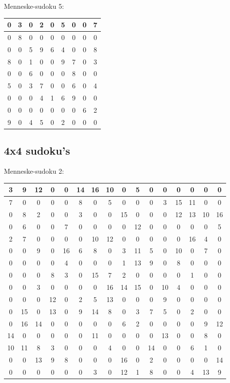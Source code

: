 \documentclass[]{report}
\begin{document}
Menneske-sudoku 5:
\begin{tabular}{|c|c|c||c|c|c||c|c|c|}
\hline
0&3&0&2&0&5&0&0&7\\ \hline
0&8&0&0&0&0&0&0&0\\\hline
0&0&5&9&6&4&0&0&8\\\hline\hline
8&0&1&0&0&9&7&0&3\\\hline
0&0&6&0&0&0&8&0&0\\\hline
5&0&3&7&0&0&6&0&4\\\hline\hline
0&0&0&4&1&6&9&0&0\\\hline
0&0&0&0&0&0&0&6&2\\\hline
9&0&4&5&0&2&0&0&0\\ \hline
\end{tabular}

\subsection{4x4 sudoku's}
Menneske-sudoku 2:
\begin{tabular}{|c|c|c|c||c|c|c|c||c|c|c|c||c|c|c|c}
\hline
3&9&12&0&0&14&16&10&0&5&0&0&0&0&0&0\\\hline
7&0&0&0&0&8&0&5&0&0&0&3&15&11&0&0\\\hline
0&8&2&0&0&3&0&0&15&0&0&0&12&13&10&16\\\hline
0&6&0&0&7&0&0&0&0&12&0&0&0&0&0&5\\\hline\hline
2&7&0&0&0&0&10&12&0&0&0&0&0&16&4&0\\\hline
0&0&9&0&16&6&8&0&3&11&5&0&10&0&7&0\\\hline
0&0&0&0&4&0&0&0&1&13&9&0&8&0&0&0\\\hline
0&0&0&8&3&0&15&7&2&0&0&0&0&1&0&0\\\hline\hline
0&0&3&0&0&0&0&16&14&15&0&10&4&0&0&0\\\hline
0&0&0&12&0&2&5&13&0&0&0&9&0&0&0&0\\\hline
0&15&0&13&0&9&14&8&0&3&7&5&0&2&0&0\\\hline
0&16&14&0&0&0&0&0&6&2&0&0&0&0&9&12\\\hline\hline
14&0&0&0&0&0&11&0&0&0&0&13&0&0&8&0\\\hline
10&11&8&3&0&0&0&4&0&0&14&0&0&6&1&0\\\hline
0&0&13&9&8&0&0&0&16&0&2&0&0&0&0&14\\\hline
0&0&0&0&0&0&3&0&12&1&8&0&0&4&13&9\\\hline
\end{tabular}
\end{document}

